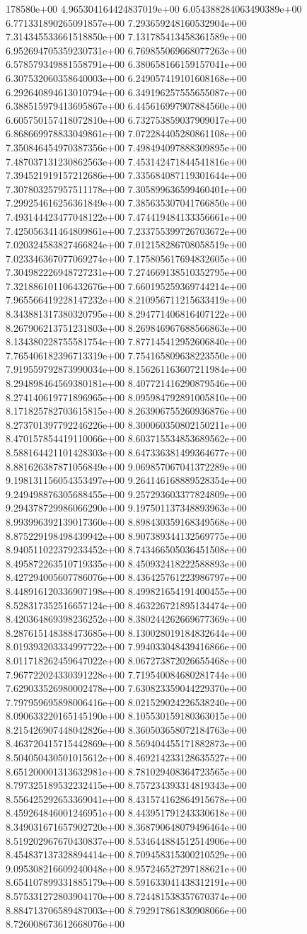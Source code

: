 178580e+00	4.965304164424837019e+00	6.054388284063490389e+00	6.771331890265091857e+00	7.293659248160532904e+00	7.314345533661518850e+00	7.131785413458361589e+00	6.952694705359230731e+00	6.769855069668077263e+00	6.578579349881558791e+00	6.380658166159157041e+00	6.307532060358640003e+00	6.249057419101608168e+00	6.292640894613010794e+00	6.349196257555655087e+00	6.388515979413695867e+00	6.445616997907884560e+00	6.605750157418072810e+00	6.732753859037909017e+00	6.868669978833049861e+00	7.072284405280861108e+00	7.350846454970387356e+00	7.498494097888309895e+00	7.487037131230862563e+00	7.453142471844541816e+00	7.394521919157212686e+00	7.335684087119301644e+00	7.307803257957511178e+00	7.305899636599460401e+00	7.299254616256361849e+00	7.385635307041766850e+00	7.493144423477048122e+00	7.474419484133356661e+00	7.425056341464809861e+00	7.233755399726703672e+00	7.020324583827466824e+00	7.012158286708058519e+00	7.023346367077069274e+00	7.175805617694832605e+00	7.304982226948727231e+00	7.274669138510352795e+00	7.321886101106432676e+00	7.660195259369744214e+00	7.965566419228147232e+00	8.210956711215633419e+00	8.343881317380320795e+00	8.294771406816407122e+00	8.267906213751231803e+00	8.269846967688566863e+00	8.134380228755581754e+00	7.877145412952606840e+00	7.765406182396713319e+00	7.754165809638223550e+00	7.919559792873990034e+00	8.156261163607211984e+00	8.294898464569380181e+00	8.407721416290879546e+00	8.274140619771896965e+00	8.095984792891005810e+00	8.171825782703615815e+00	8.263906755260936876e+00	8.273701397792246226e+00	8.300060350802150211e+00	8.470157854419110066e+00	8.603715534853689562e+00	8.588164421101428303e+00	8.647336381499364677e+00	8.881626387871056849e+00	9.069857067041372289e+00	9.198131156054353497e+00	9.264146168889528354e+00	9.249498876305688455e+00	9.257293603377824809e+00	9.294378729986066290e+00	9.197501137348893963e+00	8.993996392139017360e+00	8.898430359168349568e+00	8.875229198498439942e+00	8.907389344132569775e+00	8.940511022379233452e+00	8.743466505036451508e+00	8.495872263510719335e+00	8.450932418222588893e+00	8.427294005607786076e+00	8.436425761223986797e+00	8.448916120336907198e+00	8.499821654191400455e+00	8.528317352516657124e+00	8.463226721895134474e+00	8.420364869398236252e+00	8.380244262669677369e+00	8.287615148388473685e+00	8.130028019184832644e+00	8.019393203334997722e+00	7.994033048439416866e+00	8.011718262459647022e+00	8.067273872026655468e+00	7.967722024330391228e+00	7.719540084680281744e+00	7.629033526980002478e+00	7.630823359044229370e+00	7.797959695898006416e+00	8.021529024226538240e+00	8.090633220165145190e+00	8.105530159180363015e+00	8.215426907448042826e+00	8.360503658072184763e+00	8.463720415715442869e+00	8.569404455171882873e+00	8.504050430501015612e+00	8.469214233128635527e+00	8.651200001313632981e+00	8.781029408364723565e+00	8.797325189532232415e+00	8.757234393314819343e+00	8.556425292653369041e+00	8.431574162864915678e+00	8.459264846001246951e+00	8.443951791243330618e+00	8.349031671657902720e+00	8.368790648079496464e+00	8.519202967670430837e+00	8.534644884512514906e+00	8.454837137328894414e+00	8.709458315300210529e+00	9.095308216609240048e+00	8.957246527297188621e+00	8.654107899331885179e+00	8.591633041438312191e+00	8.575331272803904170e+00	8.724481538357670374e+00	8.884713706589487003e+00	8.792917861830908066e+00	8.726008673612668076e+00	